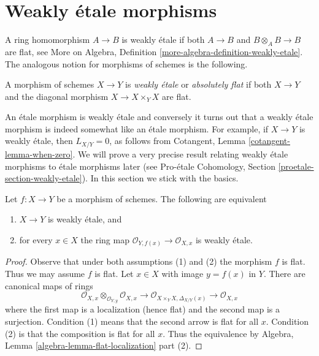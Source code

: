 









\section{Weakly \'etale morphisms}
\label{section-weakly-etale}

\noindent
A ring homomorphism $A \to B$ is weakly \'etale if both $A \to B$ and
$B \otimes_A B \to B$ are flat, see
More on Algebra, Definition \ref{more-algebra-definition-weakly-etale}.
The analogous notion for morphisms of schemes is the following.

\begin{definition}
\label{definition-weakly-etale}
A morphism of schemes $X \to Y$ is {\it weakly \'etale} or
{\it absolutely flat} if both $X \to Y$ and the diagonal
morphism $X \to X \times_Y X$ are flat.
\end{definition}

\noindent
An \'etale morphism is weakly \'etale and conversely
it turns out that a weakly \'etale morphism is indeed somewhat
like an \'etale morphism. For example, if $X \to Y$ is weakly
\'etale, then $L_{X/Y} = 0$, as follows from
Cotangent, Lemma \ref{cotangent-lemma-when-zero}.
We will prove a very precise result relating weakly \'etale
morphisms to \'etale morphisms later (see
Pro-\'etale Cohomology, Section \ref{proetale-section-weakly-etale}).
In this section we stick with the basics.

\begin{lemma}
\label{lemma-check-weakly-etale-stalks}
Let $f : X \to Y$ be a morphism of schemes. The following are equivalent
\begin{enumerate}
\item $X \to Y$ is weakly \'etale, and
\item for every $x \in X$ the ring map
$\mathcal{O}_{Y, f(x)} \to \mathcal{O}_{X, x}$ is weakly \'etale.
\end{enumerate}
\end{lemma}

\begin{proof}
Observe that under both assumptions (1) and (2) the morphism $f$ is flat.
Thus we may assume $f$ is flat. Let $x \in X$ with image $y = f(x)$ in $Y$.
There are canonical maps of rings
$$
\mathcal{O}_{X, x} \otimes_{\mathcal{O}_{Y, y}} \mathcal{O}_{X, x}
\longrightarrow
\mathcal{O}_{X \times_Y X, \Delta_{X/Y}(x)}
\longrightarrow
\mathcal{O}_{X, x}
$$
where the first map is a localization (hence flat) and the second map is a
surjection. Condition (1) means that the second arrow is flat for all $x$.
Condition (2) is that the composition is flat for all $x$. Thus the equivalence
by Algebra, Lemma \ref{algebra-lemma-flat-localization} part (2).
\end{proof}


